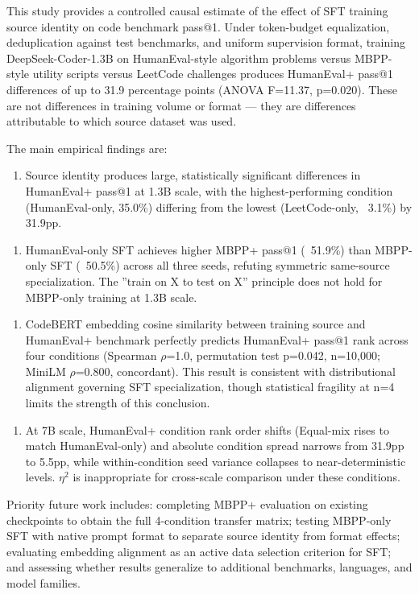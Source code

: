 
This study provides a controlled causal estimate of the effect of SFT training source identity on code benchmark pass@1. Under token-budget equalization, deduplication against test benchmarks, and uniform supervision format, training DeepSeek-Coder-1.3B on HumanEval-style algorithm problems versus MBPP-style utility scripts versus LeetCode challenges produces HumanEval+ pass@1 differences of up to 31.9 percentage points (ANOVA F=11.37, p=0.020). These are not differences in training volume or format --- they are differences attributable to which source dataset was used.

The main empirical findings are:

\begin{enumerate}
\item Source identity produces large, statistically significant differences in HumanEval+ pass@1 at 1.3B scale, with the highest-performing condition (HumanEval-only, 35.0\%) differing from the lowest (LeetCode-only, ~3.1\%) by 31.9pp.
\end{enumerate}

\begin{enumerate}
\item HumanEval-only SFT achieves higher MBPP+ pass@1 (~51.9\%) than MBPP-only SFT (~50.5\%) across all three seeds, refuting symmetric same-source specialization. The ''train on X to test on X'' principle does not hold for MBPP-only training at 1.3B scale.
\end{enumerate}

\begin{enumerate}
\item CodeBERT embedding cosine similarity between training source and HumanEval+ benchmark perfectly predicts HumanEval+ pass@1 rank across four conditions (Spearman $\rho$=1.0, permutation test p=0.042, n=10,000; MiniLM $\rho$=0.800, concordant). This result is consistent with distributional alignment governing SFT specialization, though statistical fragility at n=4 limits the strength of this conclusion.
\end{enumerate}

\begin{enumerate}
\item At 7B scale, HumanEval+ condition rank order shifts (Equal-mix rises to match HumanEval-only) and absolute condition spread narrows from 31.9pp to 5.5pp, while within-condition seed variance collapses to near-deterministic levels. $\eta^2$ is inappropriate for cross-scale comparison under these conditions.
\end{enumerate}

Priority future work includes: completing MBPP+ evaluation on existing checkpoints to obtain the full 4-condition transfer matrix; testing MBPP-only SFT with native prompt format to separate source identity from format effects; evaluating embedding alignment as an active data selection criterion for SFT; and assessing whether results generalize to additional benchmarks, languages, and model families.

